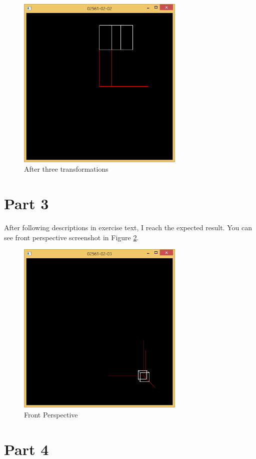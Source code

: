 \begin{figure}[hp]
\centering
\includegraphics[width=8cm]{../Screenshots/ex-2/2.png}
\caption{After three transformations}
\label{fig:2-2}
\end{figure}

\section{Part 3}
\label{sec:del-3}

After following descriptions in exercise text, I reach the expected result. You can see front perspective screenshot in Figure \ref{fig:2-3}.
\begin{figure}[hp]
\centering
\includegraphics[width=8cm]{../Screenshots/ex-2/3.png}
\caption{Front Perspective}
\label{fig:2-3}
\end{figure}

\section{Part 4}
\label{sec:del-4}

